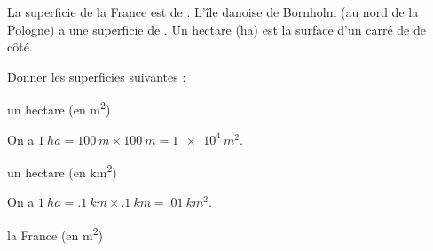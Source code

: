\hauteurLargeurCadreReponse		{8mm}{2cm}
\initialisationEntrainement

La superficie de la France est de . L’île danoise de Bornholm (au nord de la Pologne) a une superficie de . Un hectare (ha) est la surface d’un carré de  de côté. 

Donner les superficies suivantes :

\debutEntrainement



\begin{enonce}
un hectare (en \si{m^2})
\end{enonce}


\begin{corrige}
On a $\SI{1}{ha}=\SI{100}{m}\times\SI{100}{m}=\SI{1e4}{m^2}$.
\end{corrige}


\begin{enonce}
un hectare (en \si{km^2})
\end{enonce}


\begin{corrige}
On a  $\SI{1}{ha}=\SI{.1}{km}\times\SI{.1}{km}=\SI{.01}{km^2}$.
\end{corrige}





\begin{enonce}
la France (en \si{m^2})
\end{enonce}

